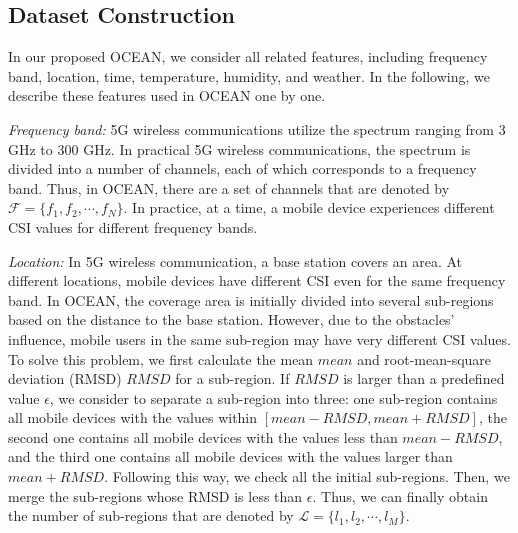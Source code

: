 \documentclass[10pt,journal,cspaper,compsoc]{IEEEtran}
\begin{document}

\subsection{Dataset Construction}
\label{subsec:dataset-constr}

In our proposed OCEAN, we consider all related features, including frequency band, location, time, temperature, humidity, and weather. In the following, we describe these features used in OCEAN one by one. 

\textit{Frequency band:} 5G wireless communications utilize the spectrum ranging from 3 GHz to 300 GHz. In practical 5G wireless communications, the spectrum is divided into a number of channels, each of which corresponds to a frequency band. Thus, in OCEAN, there are a set of channels that are denoted by $\mathcal{F} = \{f_{1}, f_{2}, \cdots, f_{N}\}$. In practice, at a time, a mobile device experiences different CSI values for different frequency bands.

\textit{Location:} In 5G wireless communication, a base station covers an area. At different locations, mobile devices have different CSI even for the same frequency band. In OCEAN, the coverage area is initially divided into several sub-regions based on the distance to the base station. However, due to the obstacles' influence, mobile users in the same sub-region may have very different CSI values. To solve this problem, we first calculate the mean $mean$ and root-mean-square deviation (RMSD) $RMSD$ for a sub-region. If $RMSD$ is larger than a predefined value $\epsilon$, we consider to separate a sub-region into three: one sub-region contains all mobile devices with the values within $[mean - RMSD, mean + RMSD]$, the second one contains all mobile devices with the values less than $mean - RMSD$, and the third one contains all mobile devices with the values larger than $mean + RMSD$. Following this way, we check all the initial sub-regions. Then, we merge the sub-regions whose RMSD is less than $\epsilon$. Thus, we can finally obtain the number of sub-regions that are denoted by $\mathcal{L} = \{l_1, l_2, \cdots, l_M\}$.
\end{document}
